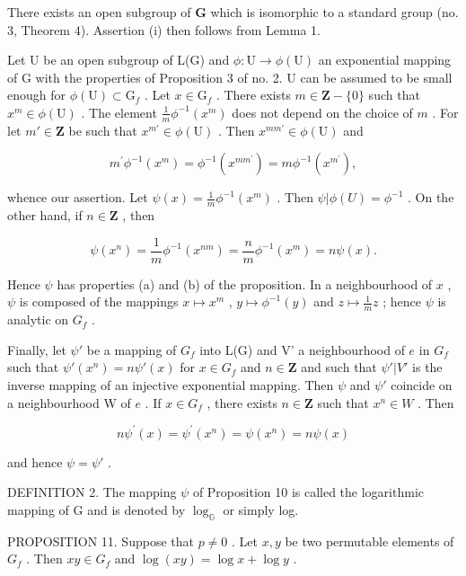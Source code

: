 There exists an open subgroup of \(\mathbf{G}\) which is isomorphic to a standard group (no. 3, Theorem 4). Assertion (i) then follows from Lemma 1.

Let U be an open subgroup of L(G) and \(\phi\colon\mathrm{U}\to\phi(\mathrm{U})\) an exponential mapping of G with the properties of Proposition 3 of no. 2. U can be assumed to be small enough for \(\phi(\mathrm{U})\subset\mathrm{G}_{f}\) . Let \(x\in\mathrm{G}_{f}\) . There exists \(m\in\mathbf{Z}-\{0\}\) such that \(x^{m}\in\phi(\mathrm{U})\) . The element \(\frac{1}{m}\phi^{-1}(x^{m})\) does not depend on the choice of \(m\) . For let \(m'\in\mathbf{Z}\) be such that \(x^{m'}\in\phi(\mathrm{U})\) . Then \(x^{mm'}\in\phi(\mathrm{U})\) and

\[
m ^ {\prime} \phi^ {- 1} (x ^ {m}) = \phi^ {- 1} (x ^ {m m ^ {\prime}}) = m \phi^ {- 1} (x ^ {m ^ {\prime}}),
\]

whence our assertion. Let \(\psi(x) = \frac{1}{m}\phi^{-1}(x^m)\) . Then \(\psi|\phi(U) = \phi^{-1}\) . On the other hand, if \(n \in \mathbf{Z}\) , then

\[
\psi (x ^ {n}) = \frac {1}{m} \phi^ {- 1} (x ^ {n m}) = \frac {n}{m} \phi^ {- 1} (x ^ {m}) = n \psi (x).
\]

Hence \(\psi\) has properties (a) and (b) of the proposition. In a neighbourhood of \(x\) , \(\psi\) is composed of the mappings \(x \mapsto x^m\) , \(y \mapsto \phi^{-1}(y)\) and \(z \mapsto \frac{1}{m} z\) ; hence \(\psi\) is analytic on \(G_f\) .

Finally, let \(\psi'\) be a mapping of \(G_f\) into L(G) and V' a neighbourhood of \(e\) in \(G_f\) such that \(\psi'(x^n) = n\psi'(x)\) for \(x \in G_f\) and \(n \in \mathbf{Z}\) and such that \(\psi'|V'\) is the inverse mapping of an injective exponential mapping. Then \(\psi\) and \(\psi'\) coincide on a neighbourhood W of \(e\) . If \(x \in G_f\) , there exists \(n \in \mathbf{Z}\) such that \(x^n \in W\) . Then

\[
n \psi^ {\prime} (x) = \psi^ {\prime} (x ^ {n}) = \psi (x ^ {n}) = n \psi (x)
\]

and hence \(\psi = \psi'\) .

DEFINITION 2. The mapping \(\psi\) of Proposition 10 is called the logarithmic mapping of G and is denoted by \(\log_{\mathbb{G}}\) or simply log.

PROPOSITION 11. Suppose that \(p \neq 0\) . Let \(x, y\) be two permutable elements of \(G_f\) . Then \(xy \in G_f\) and \(\log(xy) = \log x + \log y\) .

